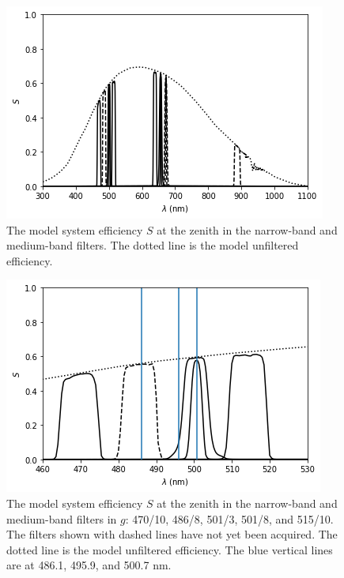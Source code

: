 \begin{figure}
\begin{center}
\includegraphics[width=0.9\linewidth]{figures/huitzi-S-NBMB.png}
\medskip
\caption{The model system efficiency $S$ at the zenith in the narrow-band and medium-band filters. The dotted line is the model unfiltered efficiency.}
\end{center}
\end{figure}

\begin{figure}
\begin{center}
\includegraphics[width=0.9\linewidth]{figures/huitzi-S-NBMB-g.png}
\medskip
\caption{The model system efficiency $S$ at the zenith in the narrow-band and medium-band filters in $g$: 470/10, 486/8, 501/3, 501/8, and 515/10. The filters shown with dashed lines have not yet been acquired. The dotted line is the model unfiltered efficiency. The blue vertical lines are at 486.1, 495.9, and 500.7 nm.}
\end{center}
\end{figure}

